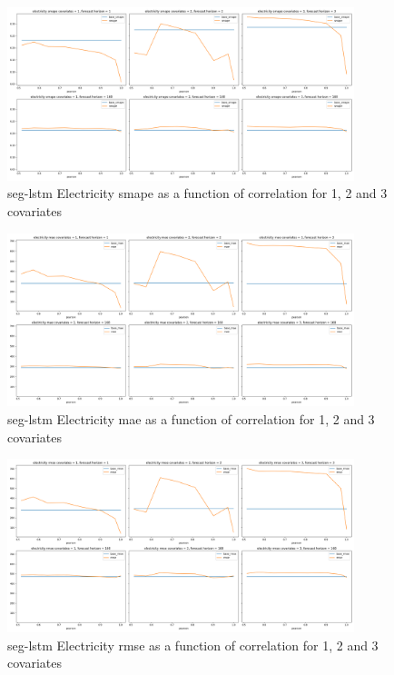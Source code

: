 \documentclass{article}
\begin{document}
  \begin{figure}[ht]
  \centering
  \includegraphics[width=0.9\textwidth]{figures/electricity-seg-lstm-smape.png}
  \caption{seg-lstm Electricity smape as a function of correlation for 1, 2 and 3 covariates}
  \label{fig:seg_lstm_electricity_smape}
  \end{figure}
  
  \begin{figure}[ht]
  \centering
  \includegraphics[width=0.9\textwidth]{figures/electricity-seg-lstm-mae.png}
  \caption{seg-lstm Electricity mae as a function of correlation for 1, 2 and 3 covariates}
  \label{fig:seg_lstm_electricity_mae}
  \end{figure}
  
  \begin{figure}[ht]
  \centering
  \includegraphics[width=0.9\textwidth]{figures/electricity-seg-lstm-rmse.png}
  \caption{seg-lstm Electricity rmse as a function of correlation for 1, 2 and 3 covariates}
  \label{fig:seg_lstm_electricity_rmse}
  \end{figure}
\end{document}
